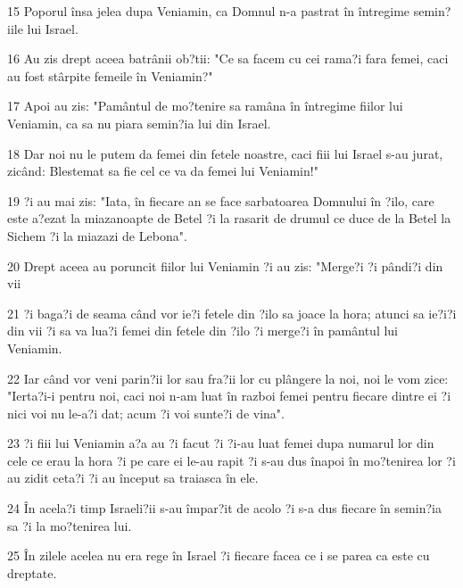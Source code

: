 \par 15 Poporul însa jelea dupa Veniamin, ca Domnul n-a pastrat în întregime semin?iile lui Israel.
\par 16 Au zis drept aceea batrânii ob?tii: "Ce sa facem cu cei rama?i fara femei, caci au fost stârpite femeile în Veniamin?"
\par 17 Apoi au zis: "Pamântul de mo?tenire sa ramâna în întregime fiilor lui Veniamin, ca sa nu piara semin?ia lui din Israel.
\par 18 Dar noi nu le putem da femei din fetele noastre, caci fiii lui Israel s-au jurat, zicând: Blestemat sa fie cel ce va da femei lui Veniamin!"
\par 19 ?i au mai zis: "Iata, în fiecare an se face sarbatoarea Domnului în ?ilo, care este a?ezat la miazanoapte de Betel ?i la rasarit de drumul ce duce de la Betel la Sichem ?i la miazazi de Lebona".
\par 20 Drept aceea au poruncit fiilor lui Veniamin ?i au zis: "Merge?i ?i pândi?i din vii
\par 21 ?i baga?i de seama când vor ie?i fetele din ?ilo sa joace la hora; atunci sa ie?i?i din vii ?i sa va lua?i femei din fetele din ?ilo ?i merge?i în pamântul lui Veniamin.
\par 22 Iar când vor veni parin?ii lor sau fra?ii lor cu plângere la noi, noi le vom zice: "Ierta?i-i pentru noi, caci noi n-am luat în razboi femei pentru fiecare dintre ei ?i nici voi nu le-a?i dat; acum ?i voi sunte?i de vina".
\par 23 ?i fiii lui Veniamin a?a au ?i facut ?i ?i-au luat femei dupa numarul lor din cele ce erau la hora ?i pe care ei le-au rapit ?i s-au dus înapoi în mo?tenirea lor ?i au zidit ceta?i ?i au început sa traiasca în ele.
\par 24 În acela?i timp Israeli?ii s-au împar?it de acolo ?i s-a dus fiecare în semin?ia sa ?i la mo?tenirea lui.
\par 25 În zilele acelea nu era rege în Israel ?i fiecare facea ce i se parea ca este cu dreptate.


